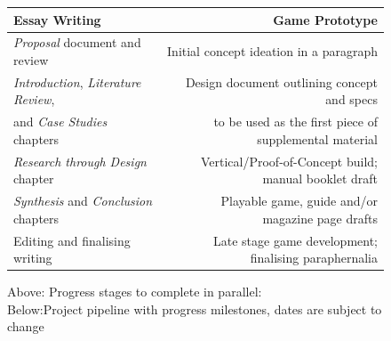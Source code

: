 \documentclass[12pt]{article}
\begin{document}
\begin{figure}[ht]\centering    
    \begin{tabular}{l | r} Essay Writing & Game Prototype                           \\\hline
        \textcolor{chap0}{\textit{Proposal} document and review}               
        &\textcolor{chap0}{Initial concept ideation in a paragraph}                 \\\hline
        \textcolor{chap1}{\textit{Introduction}, \textit{Literature Review}},  
        &\textcolor{chap1}{Design document outlining concept and specs}     \\
        \textcolor{chap1}{and \textit{Case Studies} chapters}                  
        &\textcolor{chap1}{to be used as the first piece of supplemental material} \\\hline
        \textcolor{chap2}{\textit{Research through Design} chapter}            
        &\textcolor{chap3}{Vertical/Proof-of-Concept build; manual booklet draft}   \\\hline
        \textcolor{chap3}{\textit{Synthesis} and \textit{Conclusion} chapters} 
        &\textcolor{chap3}{Playable game, guide and/or magazine page drafts}        \\\hline
        \textcolor{chap4}{Editing and finalising writing}                      
        &\textcolor{chap4}{Late stage game development; finalising paraphernalia}
    \end{tabular}   
    \caption{Above: Progress stages to complete in parallel:
        \\Below:Project pipeline with progress milestones, dates are subject to change}\vspace{8mm}
            

\end{figure}
\end{document}
